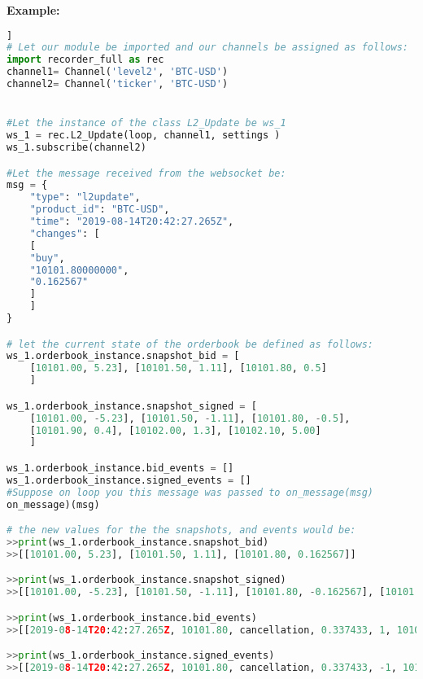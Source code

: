 \textbf{Example:}
\begin{lstlisting}[language=Python]]
# Let our module be imported and our channels be assigned as follows:
import recorder_full as rec
channel1= Channel('level2', 'BTC-USD')
channel2= Channel('ticker', 'BTC-USD')


#Let the instance of the class L2_Update be ws_1 
ws_1 = rec.L2_Update(loop, channel1, settings )
ws_1.subscribe(channel2)

#Let the message received from the websocket be:
msg = {
	"type": "l2update",
	"product_id": "BTC-USD",
	"time": "2019-08-14T20:42:27.265Z",
	"changes": [
	[
	"buy",
	"10101.80000000",
	"0.162567"
	]
	]
}

# let the current state of the orderbook be defined as follows:
ws_1.orderbook_instance.snapshot_bid = [
	[10101.00, 5.23], [10101.50, 1.11], [10101.80, 0.5]
	]

ws_1.orderbook_instance.snapshot_signed = [
	[10101.00, -5.23], [10101.50, -1.11], [10101.80, -0.5],
	[10101.90, 0.4], [10102.00, 1.3], [10102.10, 5.00]
	]

ws_1.orderbook_instance.bid_events = []
ws_1.orderbook_instance.signed_events = []
#Suppose on loop you this message was passed to on_message(msg)
on_message)(msg)

# the new values for the the snapshots, and events would be:
>>print(ws_1.orderbook_instance.snapshot_bid)
>>[[10101.00, 5.23], [10101.50, 1.11], [10101.80, 0.162567]]

>>print(ws_1.orderbook_instance.snapshot_signed)
>>[[10101.00, -5.23], [10101.50, -1.11], [10101.80, -0.162567], [10101.90, 0.4], [10102.00, 1.3], [10102.10, 5.00]]

>>print(ws_1.orderbook_instance.bid_events)
>>[[2019-08-14T20:42:27.265Z, 10101.80, cancellation, 0.337433, 1, 10101.85, 0.10]]

>>print(ws_1.orderbook_instance.signed_events)
>>[[2019-08-14T20:42:27.265Z, 10101.80, cancellation, 0.337433, -1, 10101.85, 0.10]]
\end{lstlisting}

